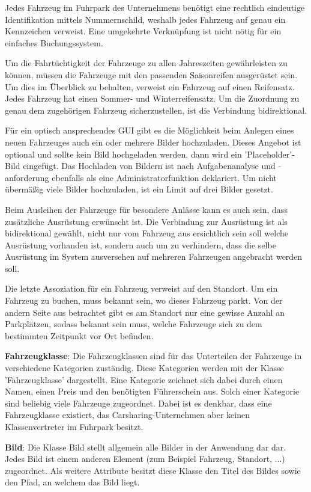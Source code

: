 Jedes Fahrzeug im Fuhrpark des Unternehmens benötigt eine rechtlich eindeutige Identifikation mittels Nummernschild, weshalb jedes Fahrzeug auf genau ein Kennzeichen verweist. Eine umgekehrte Verknüpfung ist nicht nötig für ein einfaches Buchungssystem. 

Um die Fahrtüchtigkeit der Fahrzeuge zu allen Jahreszeiten gewährleisten zu können, müssen die Fahrzeuge mit den passenden Saisonreifen ausgerüstet sein. Um dies im Überblick zu behalten, verweist ein Fahrzeug auf einen Reifensatz. Jedes Fahrzeug hat einen Sommer- und Winterreifensatz. Um die Zuordnung zu genau dem zugehörigen Fahrzeug sicherzustellen, ist die Verbindung bidirektional. 

Für ein optisch ansprechendes GUI gibt es die Möglichkeit beim Anlegen eines neuen Fahrzeuges auch ein oder mehrere Bilder hochzuladen. Dieses Angebot ist optional und sollte kein Bild hochgeladen werden, dann wird ein 'Placeholder'-Bild eingefügt. Das Hochladen von Bildern ist nach Aufgabenanalyse und -anforderung ebenfalls als eine Administratorfunktion deklariert. Um nicht übermäßig viele Bilder hochzuladen, ist ein Limit auf drei Bilder gesetzt. 

Beim Ausleihen der Fahrzeuge für besondere Anlässe kann es auch sein, dass zusätzliche Ausrüstung erwünscht ist. Die Verbindung zur Ausrüstung ist als bidirektional gewählt, nicht nur vom Fahrzeug aus ersichtlich sein soll welche Ausrüstung vorhanden ist, sondern auch um zu verhindern, dass die selbe Ausrüstung im System ausversehen auf mehreren Fahrzeugen angebracht werden soll. 

Die letzte Assoziation für ein Fahrzeug verweist auf den Standort. Um ein Fahrzeug zu buchen, muss bekannt sein, wo dieses Fahrzeug parkt. Von der andern Seite aus betrachtet gibt es am Standort nur eine gewisse Anzahl an Parkplätzen, sodass bekannt sein muss, welche Fahrzeuge sich zu dem bestimmten Zeitpunkt vor Ort befinden. 

\textbf{Fahrzeugklasse}: Die Fahrzeugklassen sind für das Unterteilen der Fahrzeuge in verschiedene Kategorien zuständig. Diese Kategorien werden mit der Klasse 'Fahrzeugklasse' dargestellt. Eine Kategorie zeichnet sich dabei durch einen Namen, einen Preis und den benötigten Führerschein aus. Solch einer Kategorie sind beliebig viele Fahrzeuge zugeordnet. Dabei ist es denkbar, dass eine Fahrzeugklasse existiert, das Carsharing-Unternehmen aber keinen Klassenvertreter im Fuhrpark besitzt. 

\textbf{Bild}: Die Klasse Bild stellt allgemein alle Bilder in der Anwendung dar dar. Jedes Bild ist einem anderen Element (zum Beispiel Fahrzeug, Standort, ...) zugeordnet. Als weitere Attribute besitzt diese Klasse den Titel des Bildes sowie den Pfad, an welchem das Bild liegt.

